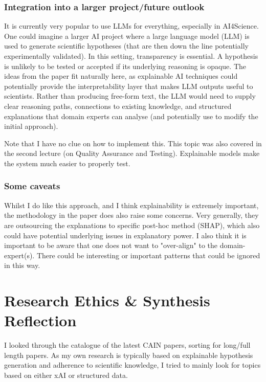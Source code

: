\documentclass[11pt,compsoc,a4paper]{IEEEtran}
\begin{document}
    \subsubsection*{Integration into a larger project/future outlook}
    It is currently very popular to use LLMs for everything, especially in AI4Science. One could imagine a larger AI project where a large language model (LLM) is used to generate scientific hypotheses (that are then down the line potentially experimentally validated). In this setting, transparency is essential. A hypothesis is unlikely to be tested or accepted if its underlying reasoning is opaque. The ideas from the paper fit naturally here, as explainable AI techniques could potentially provide the interpretability layer that makes LLM outputs useful to scientists. Rather than producing free-form text, the LLM would need to supply clear reasoning paths, connections to existing knowledge, and structured explanations that domain experts can analyse (and potentially use to modify the initial approach). 
    
    Note that I have no clue on how to implement this. This topic was also covered in the second lecture (on Quality Assurance and Testing). Explainable models make the system much easier to properly test.
    
    \subsubsection*{Some caveats}

    Whilst I do like this approach, and I think explainability is extremely important, the methodology in the paper does also raise some concerns. Very generally, they are outsourcing the explanations to specific post-hoc method (SHAP), which also could have potential underlying issues in explanatory power. I also think it is important to be aware that one does not want to "over-align" to the domain-expert(s). There could be interesting or important patterns that could be ignored in this way.
   

\newpage
\section{Research Ethics \& Synthesis Reflection}

I looked through the catalogue of the latest CAIN papers, sorting for long/full length papers. As my own research is typically based on explainable hypothesis generation and adherence to scientific knowledge, I tried to mainly look for topics based on either xAI or structured data. 
\end{document}
